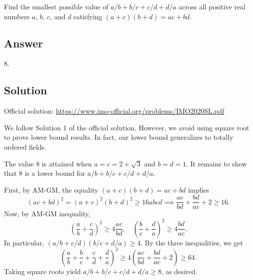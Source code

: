 Find the smallest possible value of $a/b + b/c + c/d + d/a$ across all positive real numbers $a$, $b$, $c$, and $d$ satisfying $(a + c)(b + d) = ac + bd$.



\subsection*{Answer}

$8$.


\subsection*{Solution}

Official solution: \url{https://www.imo-official.org/problems/IMO2020SL.pdf}

We follow Solution 1 of the official solution.
However, we avoid using square root to prove lower bound results.
In fact, our lower bound generalizes to totally ordered fields.

The value $8$ is attained when $a = c = 2 + \sqrt{3}$ and $b = d = 1$.
It remains to show that $8$ is a lower bound for $a/b + b/c + c/d + d/a$.

First, by AM-GM, the equality $(a + c)(b + d) = ac + bd$ implies
\[ (ac + bd)^2 = (a + c)^2 (b + d)^2 \geq 16 abcd \implies \frac{ac}{bd} + \frac{bd}{ac} + 2 \geq 16. \]
Now, by AM-GM inequality,
\[ \left(\frac{a}{b} + \frac{c}{d}\right)^2 \geq 4\frac{ac}{bd}, \quad \left(\frac{b}{c} + \frac{d}{a}\right)^2 \geq 4\frac{bd}{ac}. \]
In particular, $(a/b + c/d)(b/c + d/a) \geq 4$.
By the three inequalities, we get
\[ \left(\frac{a}{b} + \frac{b}{c} + \frac{c}{d} + \frac{d}{a}\right)^2 \geq 4\left(\frac{ac}{bd} + \frac{bd}{ac} + 2\right) \geq 64. \]
Taking square roots yield $a/b + b/c + c/d + d/a \geq 8$, as desired.
